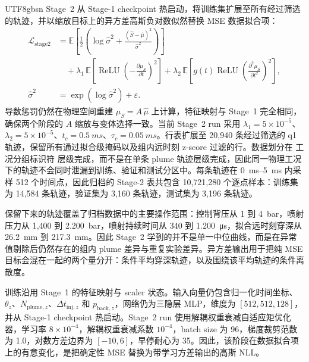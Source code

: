 \documentclass[english, 12pt, a4paper, elec, utf8, a-2b, online]{aaltothesis}
\begin{document}
\begin{CJK*}{UTF8}{gbsn}
Stage~2 从 Stage-1 checkpoint 热启动，将训练集扩展至所有经过筛选的轨迹，并以缩放目标上的异方差高斯负对数似然替换 MSE 数据拟合项：
\[
\begin{aligned}
\mathcal{L}_{\mathrm{stage2}}
&=
\mathbb{E}\!\left[
\frac{1}{2}
\left(
\log \hat{\sigma}^{2}
+\frac{(\hat{S}-\hat{\mu})^{2}}{\hat{\sigma}^{2}}
\right)\right]
\\
&\quad
+\lambda_{1}\,
\mathbb{E}\!\left[
\operatorname{ReLU}\!\left(-\frac{\partial \mu_S}{\partial t}\right)^{2}
\right]
+\lambda_{2}\,
\mathbb{E}\!\left[
g(t)\operatorname{ReLU}\!\left(\frac{\partial^{2}\mu_S}{\partial t^{2}}\right)^{2}
\right],
\\
\hat{\sigma}^{2}
&=\exp(\log\hat{\sigma}^{2})+\varepsilon.
\end{aligned}
\]
导数惩罚仍然在物理空间重建 $\mu_S=A\,\hat{\mu}$ 上计算，特征映射与 Stage~1 完全相同，确保两个阶段的 $A$ 缩放与变体选择一致。当前 Stage~2 run 采用 \(\lambda_1=5\times10^{-5}\)、\(\lambda_2=5\times10^{-5}\)、\(t_c=\SI{0.5}{ms}\)、\(\tau_c=\SI{0.05}{ms}\)。行表扩展至 20,940 条经过筛选的 q1 轨迹，保留所有通过拟合级掩码以及组内远时刻 z-score 过滤的行。数据划分在 工况分组标识符 层级完成，而不是在单条 plume 轨迹层级完成，因此同一物理工况下的轨迹不会同时泄漏到训练、验证和测试分区中。每条轨迹在 \SIrange{0}{5}{ms} 内采样 512 个时间点，因此归档的 Stage-2 表共包含 10,721,280 个逐点样本：训练集为 14,584 条轨迹，验证集为 3,160 条轨迹，测试集为 3,196 条轨迹。

保留下来的轨迹覆盖了归档数据中的主要操作范围：控制背压从 1 到 \SI{4}{bar}，喷射压力从 1,400 到 \SI{2,200}{bar}，喷射持续时间从 340 到 \SI{1,200}{\micro\second}，拟合远时刻穿深从 \SI{26.2}{mm} 到 \SI{217.3}{mm}。因此 Stage~2 学到的并不是单一中位曲线，而是在异常值剔除后仍然存在的组内 plume 差异与重复实验差异。异方差输出用于把纯 MSE 目标会混在一起的两个量分开：条件平均穿深轨迹，以及围绕该平均轨迹的条件离散度。

训练沿用 Stage~1 的特征映射与 scaler 状态。输入向量仍包含归一化时间坐标、$\theta_z$、$N_{\mathrm{plume},z}$、$\Delta t_{\mathrm{inj},z}$ 和 $p_{\mathrm{back},z}$，网络仍为三隐层 MLP，维度为 $[512,512,128]$，并从 Stage-1 checkpoint 热启动。Stage~2 run 使用解耦权重衰减自适应矩优化器，学习率 \(8\times10^{-4}\)，解耦权重衰减系数 \(10^{-4}\)，batch size 为 96，梯度裁剪范数为 1.0，对数方差边界为 \([-10,6]\)，早停耐心为 35。因此，该阶段在数据拟合项上的有意变化，是把确定性 MSE 替换为带学习方差输出的高斯 NLL。


\end{CJK*}
\end{document}
